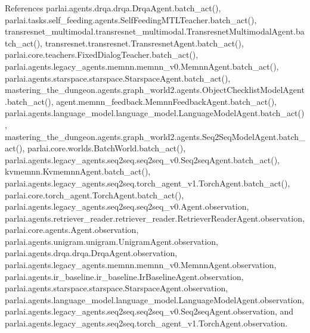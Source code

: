 References parlai.\+agents.\+drqa.\+drqa.\+Drqa\+Agent.\+batch\+\_\+act(), parlai.\+tasks.\+self\+\_\+feeding.\+agents.\+Self\+Feeding\+M\+T\+L\+Teacher.\+batch\+\_\+act(), transresnet\+\_\+multimodal.\+transresnet\+\_\+multimodal.\+Transresnet\+Multimodal\+Agent.\+batch\+\_\+act(), transresnet.\+transresnet.\+Transresnet\+Agent.\+batch\+\_\+act(), parlai.\+core.\+teachers.\+Fixed\+Dialog\+Teacher.\+batch\+\_\+act(), parlai.\+agents.\+legacy\+\_\+agents.\+memnn.\+memnn\+\_\+v0.\+Memnn\+Agent.\+batch\+\_\+act(), parlai.\+agents.\+starspace.\+starspace.\+Starspace\+Agent.\+batch\+\_\+act(), mastering\+\_\+the\+\_\+dungeon.\+agents.\+graph\+\_\+world2.\+agents.\+Object\+Checklist\+Model\+Agent.\+batch\+\_\+act(), agent.\+memnn\+\_\+feedback.\+Memnn\+Feedback\+Agent.\+batch\+\_\+act(), parlai.\+agents.\+language\+\_\+model.\+language\+\_\+model.\+Language\+Model\+Agent.\+batch\+\_\+act(), mastering\+\_\+the\+\_\+dungeon.\+agents.\+graph\+\_\+world2.\+agents.\+Seq2\+Seq\+Model\+Agent.\+batch\+\_\+act(), parlai.\+core.\+worlds.\+Batch\+World.\+batch\+\_\+act(), parlai.\+agents.\+legacy\+\_\+agents.\+seq2seq.\+seq2seq\+\_\+v0.\+Seq2seq\+Agent.\+batch\+\_\+act(), kvmemnn.\+Kvmemnn\+Agent.\+batch\+\_\+act(), parlai.\+agents.\+legacy\+\_\+agents.\+seq2seq.\+torch\+\_\+agent\+\_\+v1.\+Torch\+Agent.\+batch\+\_\+act(), parlai.\+core.\+torch\+\_\+agent.\+Torch\+Agent.\+batch\+\_\+act(), parlai.\+agents.\+legacy\+\_\+agents.\+seq2seq.\+seq2seq\+\_\+v0.\+Agent.\+observation, parlai.\+agents.\+retriever\+\_\+reader.\+retriever\+\_\+reader.\+Retriever\+Reader\+Agent.\+observation, parlai.\+core.\+agents.\+Agent.\+observation, parlai.\+agents.\+unigram.\+unigram.\+Unigram\+Agent.\+observation, parlai.\+agents.\+drqa.\+drqa.\+Drqa\+Agent.\+observation, parlai.\+agents.\+legacy\+\_\+agents.\+memnn.\+memnn\+\_\+v0.\+Memnn\+Agent.\+observation, parlai.\+agents.\+ir\+\_\+baseline.\+ir\+\_\+baseline.\+Ir\+Baseline\+Agent.\+observation, parlai.\+agents.\+starspace.\+starspace.\+Starspace\+Agent.\+observation, parlai.\+agents.\+language\+\_\+model.\+language\+\_\+model.\+Language\+Model\+Agent.\+observation, parlai.\+agents.\+legacy\+\_\+agents.\+seq2seq.\+seq2seq\+\_\+v0.\+Seq2seq\+Agent.\+observation, and parlai.\+agents.\+legacy\+\_\+agents.\+seq2seq.\+torch\+\_\+agent\+\_\+v1.\+Torch\+Agent.\+observation.

